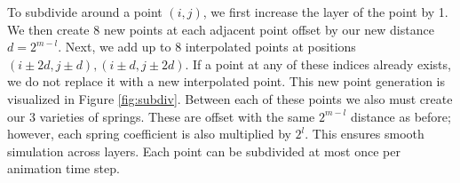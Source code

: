 \documentclass[sigconf]{acmart}
\begin{document}
To subdivide around a point $(i,j)$, we first increase the layer of the point by 1. We then create 8 new points at each adjacent point offset by our new distance $d=2^{m-l}$. Next, we add up to 8 interpolated points at positions $(i\pm2d, j\pm d), (i\pm d, j\pm 2d)$. If a point at any of these indices already exists, we do not replace it with a new interpolated point. This new point generation is visualized in Figure \ref{fig:subdiv}. Between each of these points we also must create our 3 varieties of springs. These are offset with the same $2^{m-l}$ distance as before; however, each spring coefficient is also multiplied by $2^l$. This ensures smooth simulation across layers. Each point can be subdivided at most once per animation time step.
\begin{figure}



\begin{tikzpicture}[x=0.4pt,y=0.4pt,yscale=-1,xscale=1]


\end{tikzpicture}
\end{figure}
\end{document}
